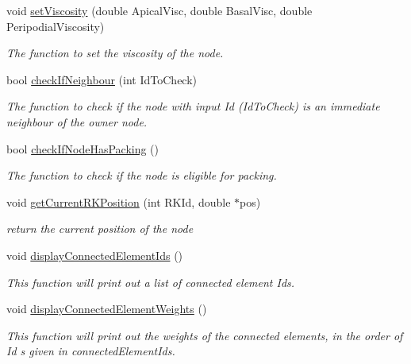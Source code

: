 \begin{DoxyCompactItemize}
\item 
void \hyperlink{classNode_a67cfbbe5179590b5deddf7d4086bc316}{set\+Viscosity} (double Apical\+Visc, double Basal\+Visc, double Peripodial\+Viscosity)
\begin{DoxyCompactList}\small\item\em The function to set the viscosity of the node. \end{DoxyCompactList}\item 
bool \hyperlink{classNode_a7dc5a9838a0a1963e58f648c5f7cb635}{check\+If\+Neighbour} (int Id\+To\+Check)
\begin{DoxyCompactList}\small\item\em The function to check if the node with input Id (Id\+To\+Check) is an immediate neighbour of the owner node. \end{DoxyCompactList}\item 
bool \hyperlink{classNode_a1d80e6f467d8ca919872b6e47a882dd5}{check\+If\+Node\+Has\+Packing} ()
\begin{DoxyCompactList}\small\item\em The function to check if the node is eligible for packing. \end{DoxyCompactList}\item 
void \hyperlink{classNode_a20d72574fb53a76cf7fda7f3a862f8d0}{get\+Current\+R\+K\+Position} (int R\+K\+Id, double $\ast$pos)
\begin{DoxyCompactList}\small\item\em return the current position of the node \end{DoxyCompactList}\item 
void \hyperlink{classNode_a3030a518aa97bd50060b8733e87540f7}{display\+Connected\+Element\+Ids} ()
\begin{DoxyCompactList}\small\item\em This function will print out a list of connected element Id\textquotesingle{}s. \end{DoxyCompactList}\item 
void \hyperlink{classNode_a755e8c3d76e7f1f0ab364fc3d4da3a9a}{display\+Connected\+Element\+Weights} ()
\begin{DoxyCompactList}\small\item\em This function will print out the weights of the connected elements, in the order of Id s given in connected\+Element\+Ids. \end{DoxyCompactList}\end{DoxyCompactItemize}
